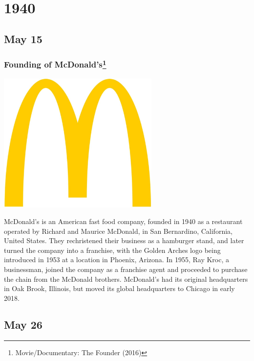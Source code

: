 \documentclass[11pt]{report}
\begin{document}
\chapter{1940}
\section{May 15}
\subsection{Founding of McDonald's\protect\footnote{Movie/Documentary: The Founder (2016)}}
\vspace{2mm}\begin{center}\includegraphics[width=8cm]{./img/mcdonaldsLogo.jpg}\end{center}
McDonald's is an American fast food company, founded in 1940 as a restaurant operated by Richard and Maurice McDonald, in San Bernardino, California, United States. They rechristened their business as a hamburger stand, and later turned the company into a franchise, with the Golden Arches logo being introduced in 1953 at a location in Phoenix, Arizona. In 1955, Ray Kroc, a businessman, joined the company as a franchise agent and proceeded to purchase the chain from the McDonald brothers. McDonald's had its original headquarters in Oak Brook, Illinois, but moved its global headquarters to Chicago in early 2018.
\section{May 26}
\end{document}

